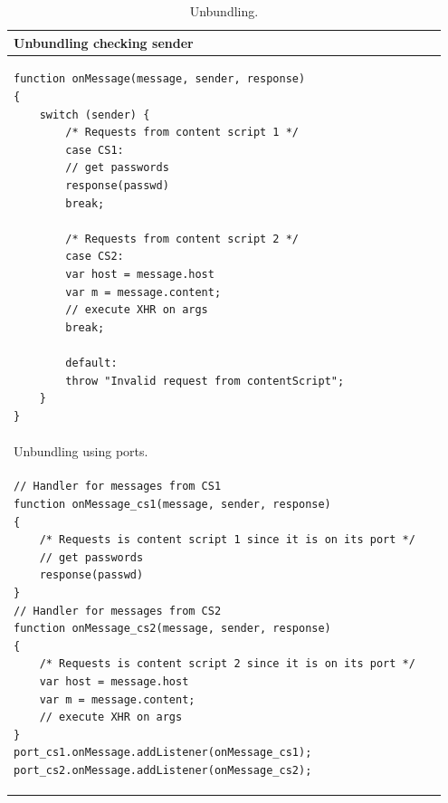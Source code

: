\begin{table}[htb]
\begin{small}
\begin{center}
\begin{tabular}{p{0.95\linewidth}}
Unbundling checking sender\\
\hline
\begin{lstlisting}
function onMessage(message, sender, response)
{    	
	switch (sender) {
		/* Requests from content script 1 */
		case CS1:
		// get passwords
		response(passwd)
		break;
		
		/* Requests from content script 2 */
		case CS2:
		var host = message.host
		var m = message.content;
		// execute XHR on args
		break;
				
		default:
		throw "Invalid request from contentScript";
	}
}
\end{lstlisting}\\
\hline
\hline
Unbundling using ports.\\
\hline
\begin{lstlisting}
// Handler for messages from CS1
function onMessage_cs1(message, sender, response)
{    	
	/* Requests is content script 1 since it is on its port */
	// get passwords
	response(passwd)
}
// Handler for messages from CS2
function onMessage_cs2(message, sender, response)
{    	
	/* Requests is content script 2 since it is on its port */
	var host = message.host
	var m = message.content;
	// execute XHR on args
}
port_cs1.onMessage.addListener(onMessage_cs1);
port_cs2.onMessage.addListener(onMessage_cs2);
\end{lstlisting}\\
\hline
\end{tabular}
\end{center}
\end{small}
\caption{Unbundling.}
\label{tab:UnBundled}
\end{table}


